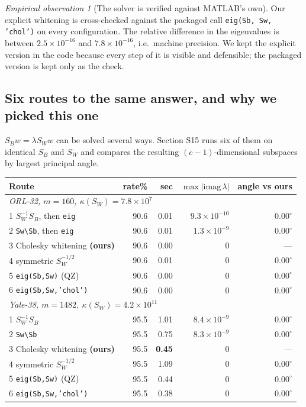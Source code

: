 \documentclass[11pt]{article}
\theoremstyle{definition}
\theoremstyle{remark}
\newtheorem*{observation}{Empirical observation}
\newcommand{\Sw}{S_W}
\newcommand{\Sb}{S_B}
\begin{document}
\begin{observation}[The solver is verified against MATLAB's own]
Our explicit whitening is cross-checked against the packaged call
\texttt{eig(Sb, Sw, 'chol')} on every configuration. The relative difference in the
eigenvalues is between $2.5\times10^{-16}$ and $7.8\times10^{-16}$, i.e.\ machine
precision. We kept the explicit version in the code because every step of it is
visible and defensible; the packaged version is kept only as the check.
\end{observation}

\subsection{Six routes to the same answer, and why we picked this one}
\label{sec:routes}

$\Sb w = \lambda \Sw w$ can be solved several ways. Section S15 runs six of them
on identical $\Sb$ and $\Sw$ and compares the resulting $(c-1)$-dimensional
subspaces by largest principal angle.

\begin{center}
\begin{tabular}{lrrrr}
\toprule
Route & rate\% & sec & $\max|\mathrm{imag}\,\lambda|$ & angle vs ours \\
\midrule
\multicolumn{5}{l}{\emph{ORL-32, $m=160$, $\kappa(\Sw)=7.8\times10^{7}$}}\\
1\; $\Sw^{-1}\Sb$, then \texttt{eig}        & 90.6 & 0.01 & $9.3\times10^{-10}$ & $0.00^\circ$ \\
2\; \texttt{Sw\textbackslash Sb}, then \texttt{eig} & 90.6 & 0.01 & $1.3\times10^{-9}$ & $0.00^\circ$ \\
3\; Cholesky whitening \textbf{(ours)}      & 90.6 & 0.00 & $0$ & --- \\
4\; symmetric $\Sw^{-1/2}$                  & 90.6 & 0.01 & $0$ & $0.00^\circ$ \\
5\; \texttt{eig(Sb,Sw)} (QZ)                & 90.6 & 0.00 & $0$ & $0.00^\circ$ \\
6\; \texttt{eig(Sb,Sw,'chol')}              & 90.6 & 0.00 & $0$ & $0.00^\circ$ \\
\midrule
\multicolumn{5}{l}{\emph{Yale-38, $m=1482$, $\kappa(\Sw)=4.2\times10^{11}$}}\\
1\; $\Sw^{-1}\Sb$                           & 95.5 & 1.01 & $8.4\times10^{-9}$ & $0.00^\circ$ \\
2\; \texttt{Sw\textbackslash Sb}            & 95.5 & 0.75 & $8.3\times10^{-9}$ & $0.00^\circ$ \\
3\; Cholesky whitening \textbf{(ours)}      & 95.5 & \textbf{0.45} & $0$ & --- \\
4\; symmetric $\Sw^{-1/2}$                  & 95.5 & 1.09 & $0$ & $0.00^\circ$ \\
5\; \texttt{eig(Sb,Sw)} (QZ)                & 95.5 & 0.44 & $0$ & $0.00^\circ$ \\
6\; \texttt{eig(Sb,Sw,'chol')}              & 95.5 & 0.38 & $0$ & $0.00^\circ$ \\
\bottomrule
\end{tabular}
\end{center}
\end{document}
